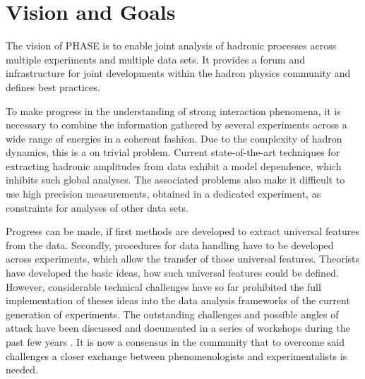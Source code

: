 \section{Vision and Goals}

The vision of PHASE is to enable joint analysis of hadronic processes across multiple experiments and multiple data sets. It provides a forum and infrastructure for joint developments within the hadron physics community and defines best practices.

To make progress in the understanding of strong interaction phenomena, it is necessary to combine the information gathered by several experiments across a wide range of energies in a coherent fashion. Due to the complexity of hadron dynamics, this is a on trivial problem. Current state-of-the-art techniques for extracting hadronic amplitudes from data exhibit a model dependence, which inhibits such global analyses. The associated problems also make it difficult to use high precision measurements, obtained in a dedicated experiment, as constraints for analyses of other data sets. 

Progress can be made, if first methods are developed to extract universal features from the data. Secondly, procedures for data handling have to be developed across experiments, which allow the transfer of those universal features. Theorists have developed the basic ideas, how such universal features could be defined. However, considerable technical challenges have so far prohibited the full implementation of theses ideas into the data analysis frameworks of the current generation of experiments. The outstanding challenges and possible angles of attack have been discussed and documented in a series of workshops during the past few years \cite{Battaglieri_2015}\cite{Brice_o_2016}\cite{Lutz_2016}. It is now a consensus in the community that to overcome said challenges a closer exchange between phenomenologists and experimentalists is needed.




